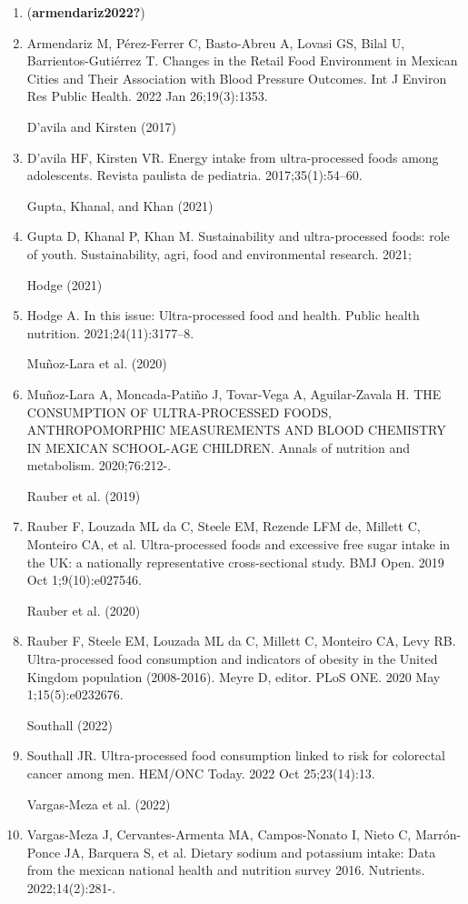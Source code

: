 \documentclass[
]{article}
\begin{document}
\begin{enumerate}
\def\labelenumi{\arabic{enumi}.}
\item
  (\textbf{armendariz2022?})
\item
  Armendariz M, Pérez-Ferrer C, Basto-Abreu A, Lovasi GS, Bilal U,
  Barrientos-Gutiérrez T. Changes in the Retail Food Environment in
  Mexican Cities and Their Association with Blood Pressure Outcomes. Int
  J Environ Res Public Health. 2022 Jan 26;19(3):1353.

  D'avila and Kirsten (2017)
\item
  D'avila HF, Kirsten VR. Energy intake from ultra-processed foods among
  adolescents. Revista paulista de pediatria. 2017;35(1):54--60.

  Gupta, Khanal, and Khan (2021)
\item
  Gupta D, Khanal P, Khan M. Sustainability and ultra-processed foods:
  role of youth. Sustainability, agri, food and environmental research.
  2021;

  Hodge (2021)
\item
  Hodge A. In this issue: Ultra-processed food and health. Public health
  nutrition. 2021;24(11):3177--8.

  Muñoz-Lara et al. (2020)
\item
  Muñoz-Lara A, Moncada-Patiño J, Tovar-Vega A, Aguilar-Zavala H. THE
  CONSUMPTION OF ULTRA-PROCESSED FOODS, ANTHROPOMORPHIC MEASUREMENTS AND
  BLOOD CHEMISTRY IN MEXICAN SCHOOL-AGE CHILDREN. Annals of nutrition
  and metabolism. 2020;76:212-.

  Rauber et al. (2019)
\item
  Rauber F, Louzada ML da C, Steele EM, Rezende LFM de, Millett C,
  Monteiro CA, et al. Ultra-processed foods and excessive free sugar
  intake in the UK: a nationally representative cross-sectional study.
  BMJ Open. 2019 Oct 1;9(10):e027546.

  Rauber et al. (2020)
\item
  Rauber F, Steele EM, Louzada ML da C, Millett C, Monteiro CA, Levy RB.
  Ultra-processed food consumption and indicators of obesity in the
  United Kingdom population (2008-2016). Meyre D, editor. PLoS ONE. 2020
  May 1;15(5):e0232676.

  Southall (2022)
\item
  Southall JR. Ultra-processed food consumption linked to risk for
  colorectal cancer among men. HEM/ONC Today. 2022 Oct 25;23(14):13.

  Vargas-Meza et al. (2022)
\item
  Vargas-Meza J, Cervantes-Armenta MA, Campos-Nonato I, Nieto C,
  Marrón-Ponce JA, Barquera S, et al. Dietary sodium and potassium
  intake: Data from the mexican national health and nutrition survey
  2016. Nutrients. 2022;14(2):281-.


\end{enumerate}
\end{document}
